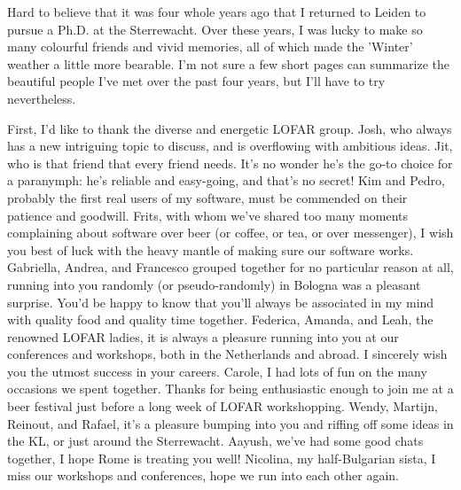 \cleardoublepage
{}
{}
\begin{thesisacknowledgements}


    \newcommand{\bees}[1]{\texttt{[image: coloremoji.sty/emoji\_images/hires/\#1.pdf]}}
\singlespacing
Hard to believe that it was four whole years ago that I returned to Leiden to pursue a Ph.D. at the Sterrewacht. Over these years, I was lucky to make so many colourful friends and vivid memories, all of which made the 'Winter' weather a little more bearable. I'm not sure a few short pages can summarize the beautiful people I've met over the past four years, but I'll have to try nevertheless.

    First, I'd like to thank the diverse and energetic LOFAR group. Josh, who always has a new intriguing topic to discuss, and is overflowing with ambitious ideas. Jit, who is that friend that every friend needs. It's no wonder he's the go-to choice for a paranymph: he's reliable and easy-going, and that's no secret! Kim and Pedro, probably the first real users of my software, must be commended on their patience and goodwill. Frits, with whom we've shared too many moments complaining about software over beer (or coffee, or tea, or over messenger), I wish you best of luck with the heavy mantle of making sure our software works. Gabriella, Andrea, and Francesco grouped together for no particular reason at all, running into you randomly (or pseudo-randomly) in Bologna was a pleasant surprise. You'd be happy to know that you'll always be associated in my mind with quality food and quality time together. Federica, Amanda, and Leah, the renowned LOFAR ladies, it is always a pleasure running into you at our conferences and workshops, both in the Netherlands and abroad. I sincerely wish you the utmost success in your careers. Carole, I had lots of fun on the many occasions we spent together. Thanks for being enthusiastic enough to join me at a beer festival just before a long week of LOFAR workshopping. Wendy, Martijn, Reinout, and Rafael, it's a pleasure bumping into you and riffing off some ideas in the KL, or just around the Sterrewacht. Aayush, we've had some good chats together, I hope Rome is treating you well! Nicolina, my half-Bulgarian sista, I miss our workshops and conferences, hope we run into each other again. 


\end{thesisacknowledgements}
